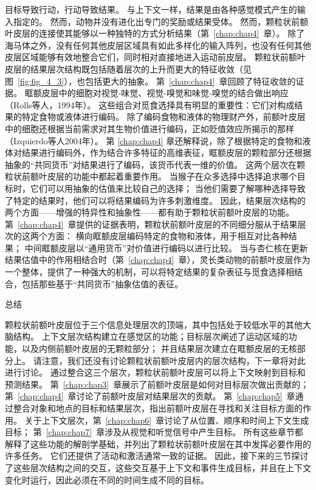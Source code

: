 目标导致行动，行动导致结果。
与上下文一样，结果是由各种感觉模式产生的输入指定的。
然而，动物并没有进化出专门的奖励或结果受体。
然而，颗粒状前额叶皮层的连接使其能够以一种独特的方式分析结果（第~\ref{chap:chap4}~章）。
除了海马体之外，没有任何其他皮层区域具有如此多样化的输入阵列，也没有任何其他皮层区域能够有效地整合它们，同时相对直接地进入运动前皮层。
颗粒状前额叶皮层的结果层次结构既包括随着层次的上升而更大的特征收敛（见图~\ref{fig:fig_4_3}），也包括更大的抽象。
第~\ref{chap:chap4}~章回顾了特征收敛的证据。
眶额皮层中的细胞对视觉-味觉、视觉-嗅觉和味觉-嗅觉的结合做出响应（Rolls等人，1994年）。
这些组合对觅食选择具有明显的重要性：它们对构成结果的特定食物或液体进行编码。
除了编码食物和液体的物理财产外，前额叶皮层中的细胞还根据当前需求对其生物价值进行编码，正如贬值效应所揭示的那样（Izquierdo等人2004年）。
第 \ref{chap:chap4} 章还解释说，除了根据特定的食物和液体对结果进行编码外，作为结合许多特征的高维表征，眶额皮层的颗粒部分还根据抽象的“共同货币”对结果进行了编码，该货币代表一维的价值。
这两个层次在颗粒状前额叶皮层的功能中都起着重要作用。
当猴子在众多选择中选择追求哪个目标时，它们可以用抽象的估值来比较自己的选择；
当他们需要了解哪种选择导致了特定的结果时，他们可以将结果编码为许多刺激维度。
因此，结果层次结构的两个方面——增强的特异性和抽象性——都有助于颗粒状前额叶皮层的功能。
第~\ref{chap:chap4}~章提供的证据表明，颗粒状前额叶皮层的不同细分服从于结果层次的这两个方面：
横向眶额皮层编码特定的食物和液体，用于相互对比各种结果；
中间眶额皮层以“通用货币”对价值进行编码以进行比较。
当与杏仁核在更新结果估值中的作用相结合时（第~\ref{chap:chap4}~章），灵长类动物的前额叶皮层作为一个整体，提供了一种强大的机制，可以将特定结果的复杂表征与觅食选择相结合，包括那些基于“共同货币”抽象估值的表征。



总结

颗粒状前额叶皮层位于三个信息处理层次的顶端，其中包括处于较低水平的其他大脑结构。
上下文层次结构建立在感觉区的功能；目标层次阐述了运动区域的功能，以及内侧前额叶皮层的无颗粒部分；
并且结果层次建立在眶额皮层的无核部分上。
请注意，我们还没有讨论颗粒状前额叶皮层内的层次结构，下一章将对此进行讨论。
通过整合这三个层次，颗粒状前额叶皮层可以将上下文映射到目标和预测结果。
第~\ref{chap:chap3}~章展示了前额叶皮层是如何对目标层次做出贡献的；
第~\ref{chap:chap4}~章讨论了前额叶皮层对结果层次的贡献。
第~\ref{chap:chap5}~章通过整合对象和地点的目标和结果层次，指出前额叶皮层在寻找和关注目标方面的作用。
关于上下文层次，第~\ref{chap:chap6}~章讨论了从位置、顺序和时间上下文生成目标；
第~\ref{chap:chap7}~章涉及从视觉和听觉信号中产生目标。
所有这些章节都解释了这些功能的解剖学基础，并列出了颗粒状前额叶皮层在其中发挥必要作用的许多任务。
它们还提供了活动和激活通常一致的证据。
因此，接下来的三节探讨了这些层次结构之间的交互，这些交互基于上下文和事件生成目标，并且在上下文变化时运行，因此必须在不同的时间生成不同的目标。




